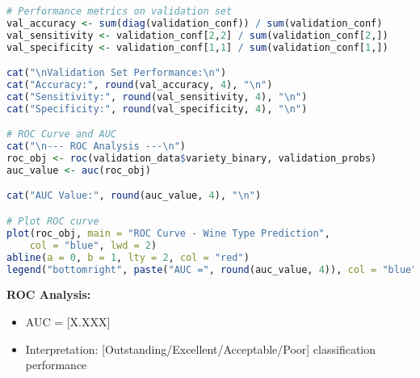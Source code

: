\begin{lstlisting}[language=R, caption=ROC Analysis]
# Performance metrics on validation set
val_accuracy <- sum(diag(validation_conf)) / sum(validation_conf)
val_sensitivity <- validation_conf[2,2] / sum(validation_conf[2,])
val_specificity <- validation_conf[1,1] / sum(validation_conf[1,])

cat("\nValidation Set Performance:\n")
cat("Accuracy:", round(val_accuracy, 4), "\n")
cat("Sensitivity:", round(val_sensitivity, 4), "\n")
cat("Specificity:", round(val_specificity, 4), "\n")

# ROC Curve and AUC
cat("\n--- ROC Analysis ---\n")
roc_obj <- roc(validation_data$variety_binary, validation_probs)
auc_value <- auc(roc_obj)

cat("AUC Value:", round(auc_value, 4), "\n")

# Plot ROC curve
plot(roc_obj, main = "ROC Curve - Wine Type Prediction",
    col = "blue", lwd = 2)
abline(a = 0, b = 1, lty = 2, col = "red")
legend("bottomright", paste("AUC =", round(auc_value, 4)), col = "blue", lwd = 2)
\end{lstlisting}

\textbf{ROC Analysis:}
\begin{itemize}
   \item AUC = [X.XXX]
   \item Interpretation: [Outstanding/Excellent/Acceptable/Poor] classification performance
\end{itemize}